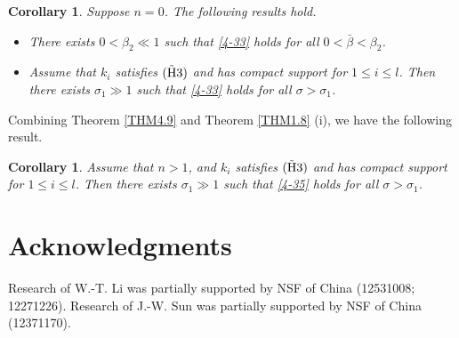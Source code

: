 \documentclass[11pt,reqno]{amsart}
\newtheorem{corollary}[theorem]{Corollary}
\numberwithin{equation}{section}
\begin{document}
\begin{corollary}
Suppose $n=0$. The following results hold.
\begin{itemize}[leftmargin=0.8cm]

\item[(i)]
There exists $0< \beta_{2}\ll 1 $ such that
\eqref{4-33} holds for all $0< \bar\beta < \beta_{2}$.



\item[(ii)]
Assume that $k_{i}$ satisfies ${ \rm (\tilde{H}3) }$ and has compact support for $1 \leq i\leq l$. Then there exists  $\sigma_{1}\gg 1$
such that  \eqref{4-33} holds for all $\sigma> \sigma_{1}$.
%

\end{itemize}
\end{corollary}

Combining Theorem \ref{THM4.9} and Theorem \ref{THM1.8} (i), we have the following result.
\begin{corollary}
Assume that $n>1$, and $k_{i}$ satisfies ${ \rm (\tilde{H}3) }$ and has compact support for $1 \leq i\leq l$.
Then there exists  $\sigma_{1}\gg 1$
such that \eqref{4-35} holds for all $\sigma> \sigma_{1}$.
\end{corollary}

\section*{Acknowledgments}
\noindent

Research of W.-T. Li was partially supported by NSF of China (12531008; 12271226). Research of J.-W. Sun was partially supported by NSF of China (12371170).
\end{document}
